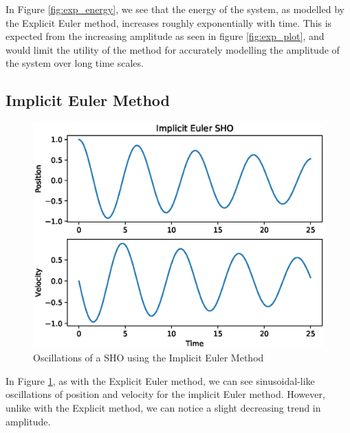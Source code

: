 \documentclass{article}
\begin{document}
In Figure \ref{fig:exp_energy}, we see that the energy of the system, as modelled by the Explicit Euler method, increases roughly exponentially with time.  This is expected from the increasing amplitude as seen in figure \ref{fig:exp_plot}, and would limit the utility of the method for accurately modelling the amplitude of the system over long time scales.  

\newpage

\subsection{Implicit Euler Method}

\begin{figure}[h!]
\centering
\includegraphics[scale=.75]{fig/implicit_plot.eps}
\caption{Oscillations of a SHO using the Implicit Euler Method}
\label{fig:imp_plot}
\end{figure}

In Figure \ref{fig:imp_plot}, as with the Explicit Euler method, we can see sinusoidal-like oscillations of position and velocity for the implicit Euler method.  However, unlike with the Explicit method, we can notice a slight decreasing trend in amplitude.  

\newpage
\end{document}

